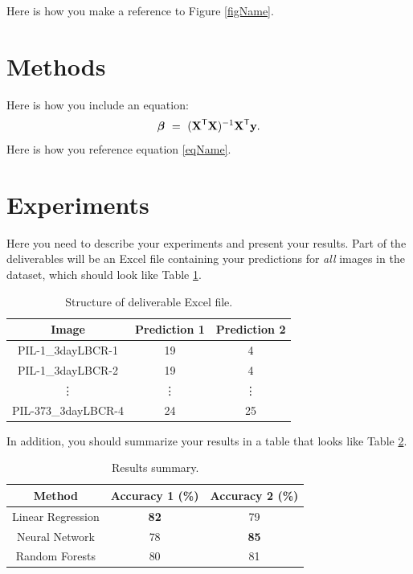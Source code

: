 \documentclass[conference]{IEEEtran}
\def \X{\boldsymbol{\rm X}}
\def \y{\boldsymbol{\rm y}}
\def \bbeta{\boldsymbol{\beta}}
\def \T{\mathsf{T}}
\begin{document}
Here is how you make a reference to Figure \ref{figName}.

\section{Methods}
Here is how you include an equation:
\begin{align}
\label{eqName}
\bbeta \ = \ (\X^\T\X)^{-1}\X^\T\y.
\end{align}
Here is how you reference equation \eqref{eqName}.



\section{Experiments}
Here you need to describe your experiments and present your results. Part of the deliverables will be an Excel file containing your predictions for {\em all} images in the dataset, which should look like Table \ref{tabDeliverable}.
\begin{table}[h]
\begin{center}
\begin{tabular}{| c || c | c |}
\hline
Image & Prediction 1 & Prediction 2 \\ \hline \hline
PIL-1\_3dayLBCR-1 & 19 & 4 \\ \hline
PIL-1\_3dayLBCR-2 & 19 & 4 \\ \hline
\vdots & \vdots & \vdots \\ \hline
PIL-373\_3dayLBCR-4 & 24 & 25 \\ \hline
\end{tabular}
\caption{Structure of deliverable Excel file.}
\label{tabDeliverable}
\end{center}
\end{table}

In addition, you should summarize your results in a table that looks like Table \ref{tabSummary}.
\begin{table}[h]
\begin{center}
\begin{tabular}{| c || c | c |}
\hline
Method & Accuracy 1 (\%) & Accuracy 2 (\%) \\ \hline \hline
Linear Regression & \textbf{82} & 79 \\ \hline
Neural Network & 78 & \textbf{85} \\ \hline
Random Forests & 80 & 81 \\ \hline
\end{tabular}
\caption{Results summary.}
\label{tabSummary}
\end{center}
\end{table}
\end{document}
